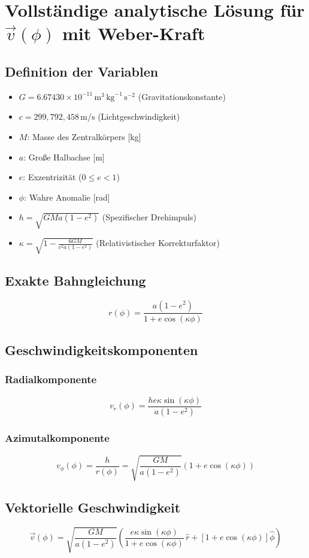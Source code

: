 \section{Vollständige analytische Lösung für $\vec{v}(\phi)$ mit Weber-Kraft}

\subsection{Definition der Variablen}
\begin{itemize}
    \item $G = 6.67430 \times 10^{-11}\,\text{m}^3\,\text{kg}^{-1}\,\text{s}^{-2}$ (Gravitationskonstante)
    \item $c = 299,\!792,\!458\,\text{m/s}$ (Lichtgeschwindigkeit)
    \item $M$: Masse des Zentralkörpers [kg]
    \item $a$: Große Halbachse [m]
    \item $e$: Exzentrizität ($0 \leq e < 1$)
    \item $\phi$: Wahre Anomalie [rad]
    \item $h = \sqrt{G M a(1-e^2)}$ (Spezifischer Drehimpuls)
    \item $\kappa = \sqrt{1 - \frac{6GM}{c^2 a(1-e^2)}}$ (Relativistischer Korrekturfaktor)
\end{itemize}

\subsection{Exakte Bahngleichung}
\begin{equation}
r(\phi) = \frac{a(1-e^2)}{1 + e \cos(\kappa \phi)}
\end{equation}

\subsection{Geschwindigkeitskomponenten}
\subsubsection{Radialkomponente}
\begin{equation}
v_r(\phi) = \frac{h e \kappa \sin(\kappa \phi)}{a(1-e^2)}
\end{equation}

\subsubsection{Azimutalkomponente}
\begin{equation}
v_\phi(\phi) = \frac{h}{r(\phi)} = \sqrt{\frac{GM}{a(1-e^2)}} \left(1 + e \cos(\kappa \phi)\right)
\end{equation}

\subsection{Vektorielle Geschwindigkeit}
\begin{equation}
\vec{v}(\phi) = \sqrt{\frac{GM}{a(1-e^2)}} \left(
    \frac{e \kappa \sin(\kappa \phi)}{1 + e \cos(\kappa \phi)} \, \hat{r}
    + \left[1 + e \cos(\kappa \phi)\right] \hat{\phi}
\right)
\end{equation}
